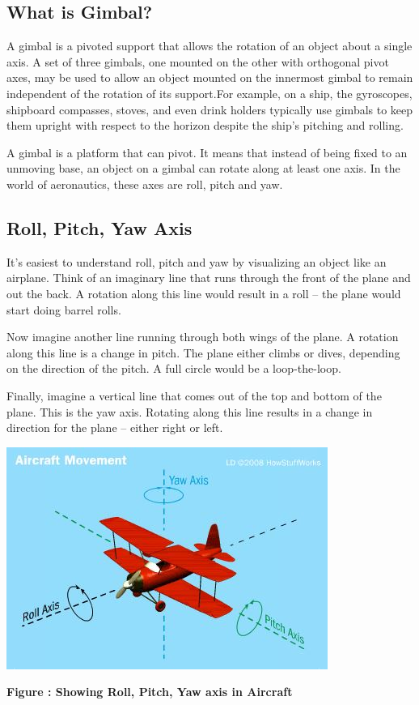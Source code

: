 \documentclass[11pt,a4paper]{article}
\begin{document}
		\subsection{What is Gimbal?}
		\par A gimbal is a pivoted support that allows the rotation of an object about a single axis. A set of three gimbals, one mounted on the other with orthogonal pivot axes, may be used to allow an object mounted on the innermost gimbal to remain independent of the rotation of its support.For example, on a ship, the gyroscopes, shipboard compasses, stoves, and even drink holders typically use gimbals to keep them upright with respect to the horizon despite the ship's pitching and rolling.
		\par A gimbal is a platform that can pivot. It means that instead of being fixed to an unmoving base, an object on a gimbal can rotate along at least one axis. In the world of aeronautics, these axes are roll, pitch and yaw.
		
		\subsection{Roll, Pitch, Yaw Axis}
		It's easiest to understand roll, pitch and yaw by visualizing an object like an airplane. Think of an imaginary line that runs through the front of the plane and out the back. A rotation along this line would result in a roll -- the plane would start doing barrel rolls.
		\par Now imagine another line running through both wings of the plane. A rotation along this line is a change in pitch. The plane either climbs or dives, depending on the direction of the pitch. A full circle would be a loop-the-loop.
		\par Finally, imagine a vertical line that comes out of the top and bottom of the plane. This is the yaw axis. Rotating along this line results in a change in direction for the plane -- either right or left.
		\newline
		\newline
		\begin{center}
			\includegraphics{Aircraft_Movement.JPG}
		\end{center}
		\begin{center}
			\textbf{Figure : Showing Roll, Pitch, Yaw axis in Aircraft}
		\end{center}
		
\end{document}
